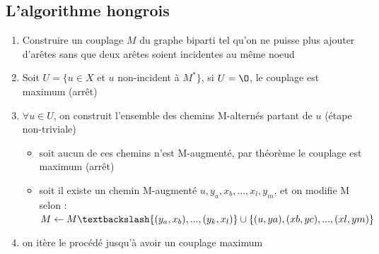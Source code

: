 \subsection{L'algorithme hongrois}
\begin{myalgo}
  \noindent
  \begin{enumerate}
    \item Construire un couplage $M$ du graphe biparti tel qu'on ne puisse plus ajouter d'arêtes sans que deux arêtes soient incidentes au même noeud
    \item Soit $U = \{u \in X$ et $u$ non-incident à $M^*\}$, si $U = \O$, le couplage est maximum (arrêt)
    \item $\forall u \in U$, on construit l'ensemble des chemins M-alternés partant de $u$ (étape non-triviale)
      \begin{itemize}
        \item soit aucun de ces chemins n'est M-augmenté, par théorème le couplage est maximum (arrêt)
        \item soit il existe un chemin M-augmenté $u,y_a,x_b,...,x_l,y_m$, et on modifie M selon :\\
        $M \leftarrow M \textbackslash\{(y_a,x_b),...,(y_k,x_l)\} \cup \{(u,ya),(xb,yc),...,(xl,ym)\}$
      \end{itemize}
    \item on itère le procédé jusqu'à avoir un couplage maximum
  \end{enumerate}
\end{myalgo}
